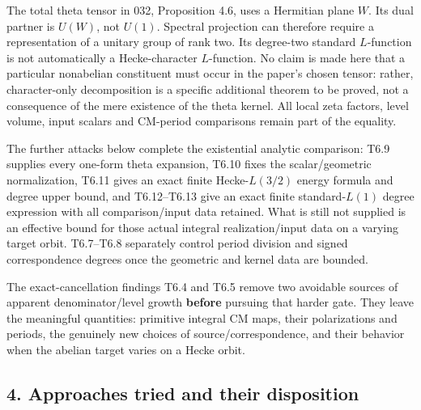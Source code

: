 The total theta tensor in 032, Proposition 4.6, uses a Hermitian plane \(W\). Its dual partner is \(U(W)\), not \(U(1)\). Spectral projection can therefore require a representation of a unitary group of rank two. Its degree-two standard \(L\)-function is not automatically a Hecke-character \(L\)-function. No claim is made here that a particular nonabelian constituent must occur in the paper's chosen tensor: rather, character-only decomposition is a specific additional theorem to be proved, not a consequence of the mere existence of the theta kernel. All local zeta factors, level volume, input scalars and CM-period comparisons remain part of the equality.

The further attacks below complete the existential analytic comparison: T6.9 supplies every one-form theta expansion, T6.10 fixes the scalar/geometric normalization, T6.11 gives an exact finite Hecke-\(L(3/2)\) energy formula and degree upper bound, and T6.12--T6.13 give an exact finite standard-\(L(1)\) degree expression with all comparison/input data retained. What is still not supplied is an effective bound for those actual integral realization/input data on a varying target orbit. T6.7--T6.8 separately control period division and signed correspondence degrees once the geometric and kernel data are bounded.

The exact-cancellation findings T6.4 and T6.5 remove two avoidable sources of apparent denominator/level growth \textbf{before} pursuing that harder gate. They leave the meaningful quantities: primitive integral CM maps, their polarizations and periods, the genuinely new choices of source/correspondence, and their behavior when the abelian target varies on a Hecke orbit.

\subsection{4. Approaches tried and their disposition}\label{approaches-tried-and-their-disposition}


